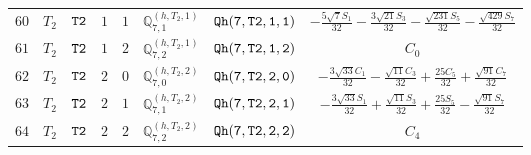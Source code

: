 \documentclass[fleqn,8pt]{jsarticle}
\begin{document}
\begin{table}[ht!]
\begin{center}
\begin{tabular}{cccccccc}
$ 60 $ & $ T_{2} $ & $ {\tt T2} $ & $ 1 $ & $ 1 $ & $ \mathbb{Q}_{7,1}^{(h,T_{2},1)} $ & $ {\tt Qh(7,T2,1,1)} $ & $ - \frac{5 \sqrt{7} S_{1}}{32} - \frac{3 \sqrt{21} S_{3}}{32} - \frac{\sqrt{231} S_{5}}{32} - \frac{\sqrt{429} S_{7}}{32} $ \\
$ 61 $ & $ T_{2} $ & $ {\tt T2} $ & $ 1 $ & $ 2 $ & $ \mathbb{Q}_{7,2}^{(h,T_{2},1)} $ & $ {\tt Qh(7,T2,1,2)} $ & $ C_{0} $ \\
$ 62 $ & $ T_{2} $ & $ {\tt T2} $ & $ 2 $ & $ 0 $ & $ \mathbb{Q}_{7,0}^{(h,T_{2},2)} $ & $ {\tt Qh(7,T2,2,0)} $ & $ - \frac{3 \sqrt{33} C_{1}}{32} - \frac{\sqrt{11} C_{3}}{32} + \frac{25 C_{5}}{32} + \frac{\sqrt{91} C_{7}}{32} $ \\
$ 63 $ & $ T_{2} $ & $ {\tt T2} $ & $ 2 $ & $ 1 $ & $ \mathbb{Q}_{7,1}^{(h,T_{2},2)} $ & $ {\tt Qh(7,T2,2,1)} $ & $ - \frac{3 \sqrt{33} S_{1}}{32} + \frac{\sqrt{11} S_{3}}{32} + \frac{25 S_{5}}{32} - \frac{\sqrt{91} S_{7}}{32} $ \\
$ 64 $ & $ T_{2} $ & $ {\tt T2} $ & $ 2 $ & $ 2 $ & $ \mathbb{Q}_{7,2}^{(h,T_{2},2)} $ & $ {\tt Qh(7,T2,2,2)} $ & $ C_{4} $ \\
 \hline \hline
\end{tabular}
\end{center}
\end{table}
\end{document}
